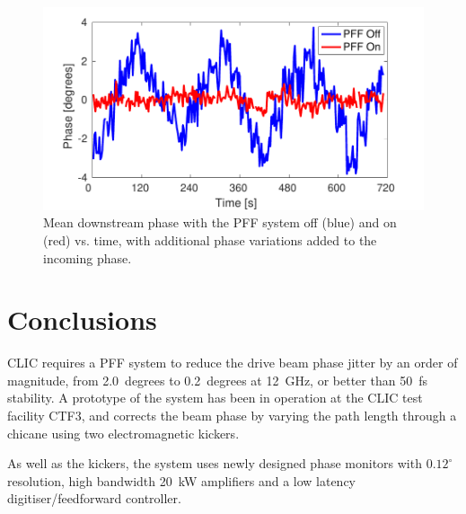 \documentclass[%
 reprint,
 amsmath,amssymb,
 prl,
]{revtex4-1}
\begin{document}
\begin{figure}
	\includegraphics[width=\columnwidth]{figs/wiggle}
	\caption{\label{fig:wiggle}Mean downstream phase with the PFF system off 
		(blue) and on (red) vs. time, with additional phase variations added to 
		the 
		incoming phase.}
\end{figure}

%
%
%

\section{\label{s:conc}Conclusions}

CLIC requires a PFF system to reduce the drive beam phase jitter by an order of 
magnitude, from 2.0~degrees to 0.2~degrees at 12~GHz, or better than 50~fs 
stability. A prototype of the system has been 
in operation at the CLIC test facility CTF3, and corrects the beam phase by 
varying the path length through a chicane using two electromagnetic kickers. 

As 
well as the kickers, the system uses newly designed phase monitors with 
\(0.12^\circ\) resolution, high bandwidth 20~kW amplifiers and a low latency 
digitiser/feedforward controller. %
\end{document}
